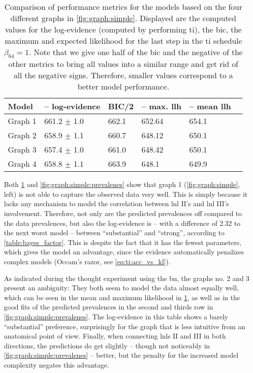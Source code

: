 \documentclass[\relativeRoot/main.tex]{subfiles}
\begin{document}
\begin{table}
    \centering
    \begin{tabular}{|l|l|l|l|l|l|}
        \hline
        \textbf{Model} & \textbf{-- log-evidence} & \textbf{BIC/2} & \textbf{-- max. llh} & \textbf{-- mean llh} \\
        \hline
        Graph 1 & 661.2 $\pm$ 1.0 & 662.1 & 652.64 & 654.1 \\ 
        Graph 2 & 658.9 $\pm$ 1.1 & 660.7 & 648.12 & 650.1 \\
        Graph 3 & 657.4 $\pm$ 1.0 & 661.0 & 648.42 & 650.1 \\ 
        Graph 4 & 658.8 $\pm$ 1.1 & 663.9 & 648.1 & 649.9 \\ 
        \hline
    \end{tabular}
    \caption[
        Comparison of performance metrics for four different simple graphs
    ]{
        Comparison of performance metrics for the models based on the four different graphs in \cref{fig:graph:simple}. Displayed are the computed values for the log-evidence (computed by performing \acrlong{ti}), the \gls{bic}, the maximum and expected likelihood for the last step in the \gls{ti} schedule $\beta_{64} = 1$. Note that we give one half of the \gls{bic} and the negative of the other metrics to bring all values into a similar range and get rid of all the negative signs. Therefore, smaller values correspond to a better model performance.
    }
    \label{table:graph:simple:comp}
\end{table}

Both \cref{table:graph:simple:comp} and \cref{fig:graph:simple:prevalenes} show that graph 1 (\cref{fig:graph:simple}, left) is not able to capture the observed data very well. This is simply because it lacks any mechanism to model the correlation between \gls{lnl} II's and \gls{lnl} III's involvement. Therefore, not only are the predicted prevalences off compared to the data prevalences, but also the log-evidence is -- with a difference of 2.32 to the next worst model -- between ``substantial'' and ``strong'', according to \cref{table:bayes_factor}. This is despite the fact that it has the fewest parameters, which gives the model an advantage, since the evidence automatically penalizes complex models (Occam's razor, see \cref{eq:ti:acc_vs_kl}).

As indicated during the thought experiment using the \acrlong{bn}, the graphs no. 2 and 3 present an ambiguity: They both seem to model the data almost equally well, which can be seen in the mean and maximum likelihood in \cref{table:graph:simple:comp}, as well as in the good fits of the predicted prevalences in the second and thirds row in \cref{fig:graph:simple:prevalenes}. The log-evidence in this table shows a barely ``substantial'' preference, surprisingly for the graph that is less intuitive from an anatomical point of view. Finally, when connecting \glspl{lnl} II and III in both directions, the predictions do get slightly -- though not noticeably in \cref{fig:graph:simple:prevalenes} -- better, but the penalty for the increased model complexity negates this advantage.
\end{document}
